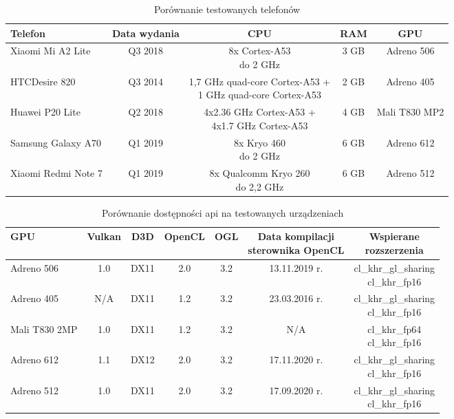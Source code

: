 \begin{table}[H]
    \caption{Porównanie testowanych telefonów}
    \label{tab:skale}
    \begin{tabular}{|l|c|c|c|c|}
\hline
\textbf{Telefon} & \textbf{Data wydania} & \textbf{CPU} & \textbf{RAM} & \textbf{GPU}\\
\hline
Xiaomi Mi A2 Lite & Q3 2018 & \makecell{8x Cortex-A53 \\ do 2 GHz} & 3 GB & Adreno 506\\
\hline
HTCDesire 820 & Q3 2014 & \makecell{1,7 GHz quad-core Cortex-A53 + \\ 1 GHz quad-core Cortex-A53} & 2 GB & Adreno 405 \\
\hline
Huawei P20 Lite & Q2 2018 & \makecell{4x2.36 GHz Cortex-A53 + \\ 4x1.7 GHz Cortex-A53} & 4 GB & Mali T830 MP2 \\
\hline
Samsung Galaxy A70 & Q1 2019 & \makecell{8x Kryo 460 \\ do 2 GHz } & 6 GB & Adreno 612 \\
\hline
Xiaomi Redmi Note 7 & Q1 2019 & \makecell{8x Qualcomm Kryo 260 \\ do 2,2 GHz} & 6 GB & Adreno 512 \\
\hline
\end{tabular}
\end{table}
\begin{table}[H]
    \caption{Porównanie dostępności api na testowanych urządzeniach}
    \label{tab:skale}
    \begin{tabular}{|l|c|c|c|c|c|c|}
\hline
\textbf{GPU} & \textbf{Vulkan} & \textbf{D3D} & \textbf{OpenCL} & \textbf{OGL} & \makecell{\textbf{Data kompilacji} \\ \textbf{sterownika OpenCL}} & \makecell{\textbf{Wspierane} \\ \textbf{rozszerzenia}}\\
\hline
Adreno 506 & 1.0 & DX11 & 2.0 & 3.2 & 13.11.2019 r. & \makecell{cl\_khr\_gl\_sharing \\ cl\_khr\_fp16}\\
\hline
Adreno 405 & N/A & DX11 & 1.2 & 3.2 & 23.03.2016 r. & \makecell{cl\_khr\_gl\_sharing \\ cl\_khr\_fp16}\\
\hline
Mali T830 2MP & 1.0 & DX11 & 1.2 & 3.2 & N/A & \makecell{cl\_khr\_fp64 \\ cl\_khr\_fp16}\\
\hline
Adreno 612 & 1.1 & DX12 & 2.0 & 3.2 & 17.11.2020 r. & \makecell{cl\_khr\_gl\_sharing \\ cl\_khr\_fp16}\\
\hline
Adreno 512 & 1.0 & DX11 & 2.0 & 3.2 & 17.09.2020 r. & \makecell{cl\_khr\_gl\_sharing \\ cl\_khr\_fp16}\\
\hline
\end{tabular}
\end{table}

